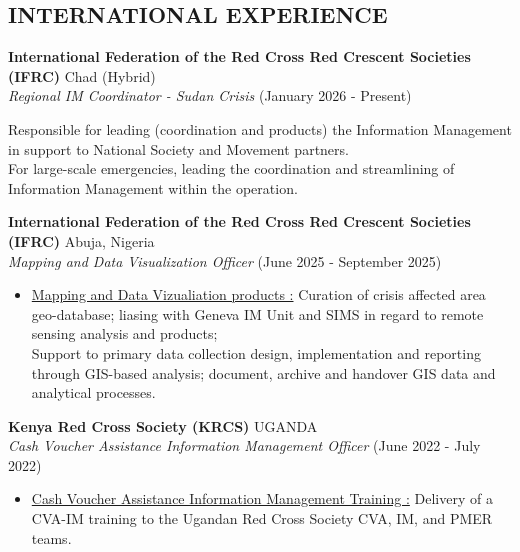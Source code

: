 \documentclass[line,margin,10pt]{res}
\begin{document}
\begin{resume}
\section{INTERNATIONAL EXPERIENCE}

\textbf{International Federation of the Red Cross Red Crescent Societies (IFRC)} \hfill Chad (Hybrid) \\
{\sl Regional IM Coordinator - Sudan Crisis} \hfill (January 2026 - Present)
\begin{itemize} \itemsep -2pt
    Responsible for leading (coordination and products) the Information Management in support to National Society and Movement partners.\\
    For large-scale emergencies, leading the coordination and streamlining of Information Management within the operation.\\
       
\end{itemize}

\textbf{International Federation of the Red Cross Red Crescent Societies (IFRC)} \hfill Abuja, Nigeria\\
{\sl Mapping and Data Visualization Officer} \hfill (June 2025 - September 2025)
\begin{itemize} \itemsep -2pt
    \item \underline{Mapping and Data Vizualiation products :}
    Curation of crisis affected area geo-database; liasing with Geneva IM Unit and SIMS in regard to remote sensing analysis and products;\\
    Support to primary data collection design, implementation and reporting through GIS-based analysis; document, archive and handover GIS data and analytical processes.\\
       
\end{itemize}

\textbf{Kenya Red Cross Society (KRCS)} \hfill  UGANDA\\
{\sl Cash Voucher Assistance Information Management Officer} \hfill (June 2022 - July 2022)
\begin{itemize} \itemsep -2pt
    \item \underline{Cash Voucher Assistance Information Management Training :}
    Delivery of a CVA-IM training to the Ugandan Red Cross Society CVA, IM, and PMER teams.\\
       
\end{itemize}


\end{resume}
\end{document}
